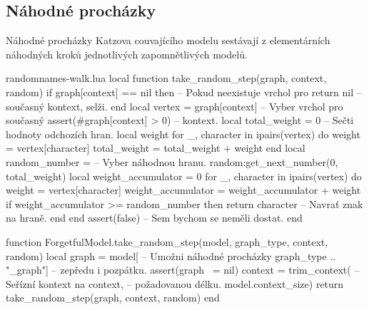 \documentclass{csbulletin}
\begin{document}
\subsection{Náhodné procházky}
\label{sec:implementace-walk}

Náhodné procházky Katzova couvajícího modelu sestávají z elementárních náhodných kroků jednotlivých zapomnětlivých modelů.

\begin{filecontents}{randomnames-walk.lua}
local function take_random_step(graph, context, random)
  if graph[context] == nil then  -- Pokud neexistuje vrchol pro
    return nil                   -- současný kontext, selži.
  end
  local vertex = graph[context]  -- Vyber vrchol pro současný
  assert(#graph[context] > 0)    -- kontext.
  local total_weight = 0         -- Sečti hodnoty odchozích hran.
  local weight
  for _, character in ipairs(vertex) do
    weight = vertex[character]
    total_weight = total_weight + weight
  end
  local random_number =          -- Vyber náhodnou hranu.
    random:get_next_number(0, total_weight)
  local weight_accumulator = 0
  for _, character in ipairs(vertex) do
    weight = vertex[character]
    weight_accumulator = weight_accumulator + weight
    if weight_accumulator >= random_number then
      return character           -- Navrať znak na hraně.
    end
  end
  assert(false)                  -- Sem bychom se neměli dostat.
end

function ForgetfulModel.take_random_step(model, graph_type,
                                         context, random)
  local graph = model[           -- Umožni náhodné procházky
    graph_type .. "_graph"]      -- zepředu i pozpátku.
  assert(graph ~= nil)
  context = trim_context(        -- Seřízní kontext na
    context,                     -- požadovanou délku.
    model.context_size)
  return take_random_step(graph, context, random)
end


\end{filecontents}
\end{document}
